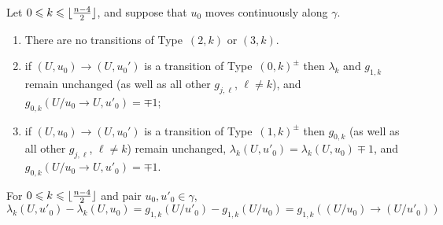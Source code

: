 \documentclass[a4paper,USenglish,cleveref, autoref, thm-restate,nolineno]{socg-lipics-v2021}
\renewcommand{\leq}{\leqslant}
\DeclarePairedDelimiter\floor{\lfloor}{\rfloor}
\begin{document}
\begin{lemma}
\label{lem:transitions}
Let $0\leq k\leq \floor{\frac{n-4}{2}}$, and suppose that $u_0$ moves continuously along $\gamma$. 
\begin{enumerate}
\item There are no transitions of Type~$(2,k)$ or $(3,k)$.
\item if $(U,u_0)\to (U,u_0')$ is a transition of Type~$(0,k)^{\pm}$ then $\lambda_k$ and $g_{1,k}$ remain unchanged (as well as all other $g_{j,\ell}$, $\ell \neq k$), and $g_{0,k}(U/u_0 \to U,u'_0) = \mp 1$; 
\item if $(U,u_0)\to (U,u_0')$ is a transition of Type~$(1,k)^{\pm}$ then $g_{0,k}$  (as well as all other $g_{j,\ell}$, $\ell \neq k$) remain unchanged, $\lambda_k(U,u'_0)=\lambda_k(U,u_0) \mp 1$, and $g_{0,k}(U/u_0 \to U,u'_0) = \mp 1$.
\end{enumerate}
\end{lemma}

\begin{corollary} 
\label{cor:difflambdak-g1k}
For $0\leq k\leq \floor{\frac{n-4}{2}}$ and pair $u_0,u'_0 \in \gamma$, 
\[
\lambda_k(U,u'_0) - \lambda_k(U,u_0) = g_{1,k}(U/u'_0)- g_{1,k}(U/u_0)= g_{1,k}( (U/u_0) \to (U/u'_0)) 
\]
\end{corollary}
\end{document}
